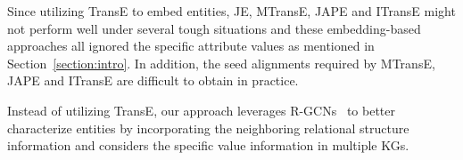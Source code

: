 	Since utilizing TransE to embed entities, JE, MTransE, JAPE and ITransE might not perform well under several tough situations and these embedding-based approaches all ignored the specific attribute values as mentioned in Section~\ref{section:intro}. In addition, the seed alignments required by MTransE, JAPE and ITransE are difficult to obtain in practice.
	
	Instead of utilizing TransE, our approach leverages R-GCNs~\cite{Schlichtkrull2017Modeling} to better characterize entities by incorporating the neighboring relational structure information and considers the specific value information in multiple KGs.
